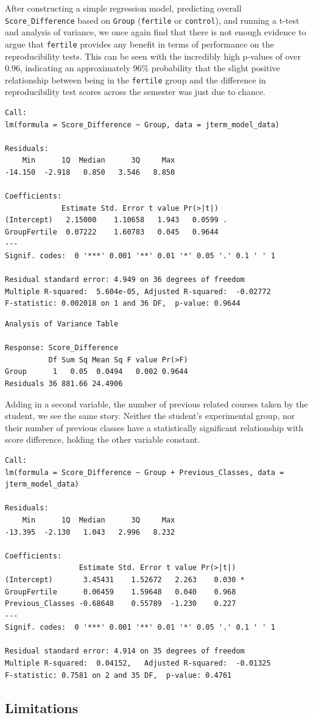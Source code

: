 \documentclass[12pt,twoside]{reedthesis}
\begin{document}
After constructing a simple regression model, predicting overall \texttt{Score\_Difference} based on \texttt{Group} (\texttt{fertile} or \texttt{control}), and running a t-test and analysis of variance, we once again find that there is not enough evidence to argue that \texttt{fertile} provides any benefit in terms of performance on the reproducibility tests. This can be seen with the incredibly high p-values of over 0.96, indicating an approximately 96\% probability that the slight positive relationship between being in the \texttt{fertile} group and the difference in reproducibility test scores across the semester was just due to chance.
\begin{verbatim}
Call:
lm(formula = Score_Difference ~ Group, data = jterm_model_data)

Residuals:
    Min      1Q  Median      3Q     Max 
-14.150  -2.918   0.850   3.546   8.850 

Coefficients:
             Estimate Std. Error t value Pr(>|t|)  
(Intercept)   2.15000    1.10658   1.943   0.0599 .
GroupFertile  0.07222    1.60783   0.045   0.9644  
---
Signif. codes:  0 '***' 0.001 '**' 0.01 '*' 0.05 '.' 0.1 ' ' 1

Residual standard error: 4.949 on 36 degrees of freedom
Multiple R-squared:  5.604e-05, Adjusted R-squared:  -0.02772 
F-statistic: 0.002018 on 1 and 36 DF,  p-value: 0.9644
\end{verbatim}
\begin{verbatim}
Analysis of Variance Table

Response: Score_Difference
          Df Sum Sq Mean Sq F value Pr(>F)
Group      1   0.05  0.0494   0.002 0.9644
Residuals 36 881.66 24.4906               
\end{verbatim}
Adding in a second variable, the number of previous related courses taken by the student, we see the same story. Neither the student's experimental group, nor their number of previous classes have a statistically significant relationship with score difference, holding the other variable constant.
\begin{verbatim}
Call:
lm(formula = Score_Difference ~ Group + Previous_Classes, data = jterm_model_data)

Residuals:
    Min      1Q  Median      3Q     Max 
-13.395  -2.130   1.043   2.996   8.232 

Coefficients:
                 Estimate Std. Error t value Pr(>|t|)  
(Intercept)       3.45431    1.52672   2.263    0.030 *
GroupFertile      0.06459    1.59648   0.040    0.968  
Previous_Classes -0.68648    0.55789  -1.230    0.227  
---
Signif. codes:  0 '***' 0.001 '**' 0.01 '*' 0.05 '.' 0.1 ' ' 1

Residual standard error: 4.914 on 35 degrees of freedom
Multiple R-squared:  0.04152,   Adjusted R-squared:  -0.01325 
F-statistic: 0.7581 on 2 and 35 DF,  p-value: 0.4761
\end{verbatim}
\hypertarget{limitations}{%
\subsection{Limitations}\label{limitations}}
\end{document}
